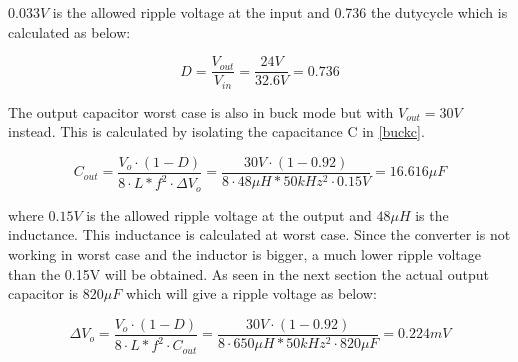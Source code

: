 $0.033V$ is the allowed ripple voltage at the input and 0.736 the dutycycle which is calculated as below:

\begin{equation} \label{buckduty}
D = \frac{V_{out}}{V_{in}} = \frac{24V}{32.6V} = 0.736
\end{equation} 


The output capacitor worst case is also in buck mode but with $V_{out}=30V$  instead. This is calculated by isolating the capacitance C in \ref{buckc}. 

\begin{equation} \label{buckc} 
C_{out} =\frac{V_{o}\cdot (1-D)}{8\cdot L*f^2\cdot \Delta V_o} = \frac{30V\cdot (1-0.92)}{8\cdot 48\mu H*50kHz^2\cdot 0.15V} = 16.616\mu F
\end{equation}

where $0.15V$ is the allowed ripple voltage at the output and $48\mu H$ is the inductance. This inductance is calculated at worst case. 
Since the converter is not working in worst case and the inductor is bigger, a much lower ripple voltage than the 0.15V will be obtained. As seen in the next section the actual output capacitor is $820\mu F$ which will give a ripple voltage as below:

\begin{equation} \label{buckc} 
\Delta V_o = \frac{V_{o}\cdot (1-D)}{8\cdot L*f^2\cdot C_{out}} = \frac{30V\cdot (1-0.92)}{8\cdot 650\mu H*50kHz^2\cdot 820\mu F} = 0.224mV
\end{equation}
   